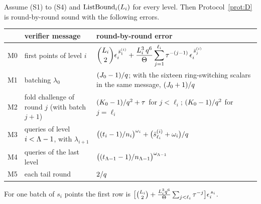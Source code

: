 \begin{theorem}\label{thm:rbr-deep}
Assume \textnormal{(S1)} to \textnormal{(S4)} and $\mathrm{ListBound}_i(L_i)$ for every level. Then Protocol~\ref{prot:D} is round-by-round sound with the following errors.
\begin{center}\upshape
\renewcommand{\arraystretch}{1.9}
\begin{tabular}{@{}lp{}p{}@{}}
\toprule
 & verifier message & round-by-round error\\
\midrule
M0 & first points of level $i$ & $\displaystyle\binom{L_i}{2}\epsilon_i^{\,\bar s^{(i)}_1}+\frac{L_i^3\,q^6}{\Theta}\sum_{j=1}^{\ell_i}\tau^{-(j-1)}\,\epsilon_i^{\,\bar s^{(i)}_j}$\\
M1 & batching $\lambda_0$ & $(J_0-1)/q$; with the sixteen ring-switching scalars in the same message, $(J_0+1)/q$\\
M2 & fold challenge of round $j$ (with batch $j+1$) & $(K_0-1)/q^2+\tau$ for $j<\ell_i$; $(K_0-1)/q^2$ for $j=\ell_i$\\
M3 & queries of level $i<\Lambda-1$, with $\lambda_{i+1}$ & $\bigl((t_i-1)/n_i\bigr)^{\omega_i}+\bigl(\bar s^{(i)}_{\ell_i}+\omega_i\bigr)/q$\\
M4 & queries of the last level & $\bigl((t_{\Lambda-1}-1)/n_{\Lambda-1}\bigr)^{\omega_{\Lambda-1}}$\\
M5 & each tail round & $2/q$\\
\bottomrule
\end{tabular}
\end{center}
For one batch of $s_i$ points the first row is $\bigl[\binom{L_i}{2}+\frac{L_i^3q^6}{\Theta}\sum_{j<\ell_i}\tau^{-j}\bigr]\epsilon_i^{\,s_i}$.
\end{theorem}
